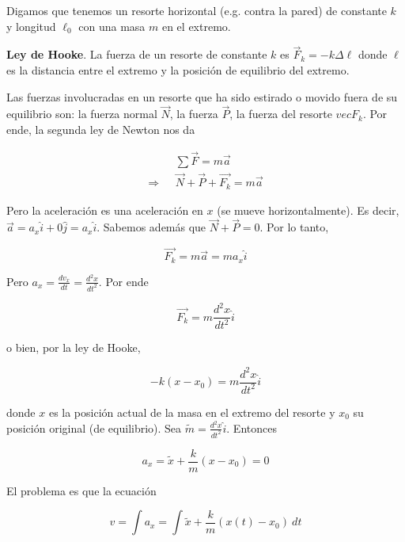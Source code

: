 \documentclass[12pt]{article}
\theoremstyle{definition}
\begin{document}
Digamos que tenemos un resorte horizontal (e.g. contra la pared) de constante $k$ y longitud $\ell_0$ con una masa
$m$ en el extremo. 

\begin{shaded}
    \textbf{Ley de Hooke}. La fuerza de un resorte de constante $k$ es 
    $\vec{F}_k = -k \Delta \ell$ donde $\ell$ es la distancia entre el extremo 
    y la posición de equilibrio del extremo.
\end{shaded}

Las fuerzas involucradas en un resorte que ha sido estirado o movido fuera de su
equilibrio son: la fuerza normal $\vec{N}$, la fuerza $\vec{P}$, la fuerza del
resorte $vec{F}_k$. Por ende, la segunda ley de Newton nos da 

\begin{align*}
    &\sum \vec{F} = m \vec{a}\\ 
    \Rightarrow ~ ~ ~ & \vec{N} + \vec{P} + \vec{F_k} = m \vec{a}
\end{align*}

Pero la aceleración es una aceleración en $x$ (se mueve horizontalmente). Es
decir, $\vec{a} = a_x \hat{i} + 0 \hat{j} = a_x \hat{i}$. Sabemos además que
$\vec{N} + \vec{P} = 0$. Por lo tanto, 

\begin{equation*}
    \vec{F_k} = m\vec{a} = ma_x \hat{i} 
\end{equation*}

Pero $a_x = \frac{dv_x}{dt} = \frac{d^2 x}{dt^2}$. Por ende

\begin{equation*}
    \vec{F_k} = m \frac{d^2 x}{dt^2} \hat{i}
\end{equation*}

o bien, por la ley de Hooke, 

\begin{equation*}
    -k(x - x_0) = m \frac{d^2 x}{dt^2} \hat{i}
\end{equation*}

donde $x$ es la posición actual de la masa en el extremo del resorte y $x_0$ su
posición original (de equilibrio). Sea $\widetilde{ m } = \frac{d^2 x}{dt^2}
\hat{i}$.
Entonces

\begin{equation*}
    a_x = \widetilde{ x }  + \frac{k}{m}(x - x_0) = 0
\end{equation*}

El problema es que la ecuación 

\begin{equation*}
    v = \int a_x = \int \widetilde{ x } + \frac{k}{m}(x(t) - x_0) ~ dt
\end{equation*}
\end{document}
